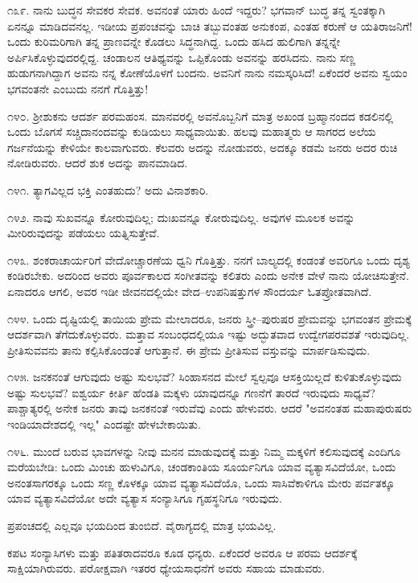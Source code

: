 ೧೩೯. ನಾನು ಬುದ್ಧನ ಸೇವಕರ ಸೇವಕ. ಅವನಂತೆ ಯಾರು ಹಿಂದೆ ಇದ್ದರು? ಭಗವಾನ್ ಬುದ್ಧ ತನ್ನ ಸ್ವಂತಕ್ಕಾಗಿ ಏನನ್ನೂ ಮಾಡಿದವನಲ್ಲ. ಇಡೀಯ ಪ್ರಪಂಚವನ್ನು ಬಾಚಿ ತಬ್ಬುವಂತಹ ಅನುಕಂಪ, ಎಂತಹ ಕರುಣೆ ಆ ಯತಿರಾಜನಿಗೆ! ಒಂದು ಕುರಿಮರಿಗಾಗಿ ತನ್ನ ಪ್ರಾಣವನ್ನೇ ಕೊಡಲು ಸಿದ್ಧನಾಗಿದ್ದ. ಒಂದು ಹಸಿದ ಹುಲಿಗಾಗಿ ತನ್ನನ್ನೇ ಅರ್ಪಿಸಿಕೊಳ್ಳುವುದರಲ್ಲಿದ್ದ. ಚಂಡಾಲನ ಆತಿಥ್ಯವನ್ನು ಒಪ್ಪಿಕೊಂಡು ಅವನನ್ನು ಹರಸಿದನು. ನಾನು ಸಣ್ಣ ಹುಡುಗನಾಗಿದ್ದಾಗ ಅವನು ನನ್ನ ಕೋಣೆಯೊಳಗೆ ಬಂದನು. ಅವನಿಗೆ ನಾನು ನಮಸ್ಕರಿಸಿದೆ! ಏಕೆಂದರೆ ಅವನು ಸ್ವಯಂ ಭಗವಂತನೇ ಎಂಬುದು ನನಗೆ ಗೊತ್ತಿತ್ತು!

೧೪೦. ಶ‍್ರೀಶುಕನು ಆದರ್ಶ ಪರಮಹಂಸ. ಮಾನವರಲ್ಲಿ ಅವನೊಬ್ಬನಿಗೆ ಮಾತ್ರ ಅಖಂಡ ಬ್ರಹ್ಮಾನಂದದ ಕಡಲಿನಲ್ಲಿ ಒಂದು ಬೊಗಸೆ ಸಚ್ಚಿದಾನಂದವನ್ನು ಕುಡಿಯಲು ಸಾಧ್ಯವಾಯಿತು. ಹಲವು ಮಹಾತ್ಮರು ಆ ಸಾಗರದ ಅಲೆಯ ಗರ್ಜನೆಯನ್ನು ಕೇಳಿಯೇ ಕಾಲವಾಗುವರು. ಕೆಲವರು ಅದನ್ನು ನೋಡುವರು, ಅದಕ್ಕೂ ಕಡಮೆ ಜನರು ಅದರ ರುಚಿ ನೋಡಿರುವರು. ಆದರೆ ಶುಕ ಅದನ್ನು ಪಾನಮಾಡಿದ.

೧೪೧. ತ್ಯಾಗವಿಲ್ಲದ ಭಕ್ತಿ ಎಂತಹುದು? ಅದು ವಿನಾಶಕಾರಿ.

೧೪೨. ನಾವು ಸುಖವನ್ನೂ ಕೋರುವುದಿಲ್ಲ; ದುಃಖವನ್ನೂ ಕೋರುವುದಿಲ್ಲ. ಅವುಗಳ ಮೂಲಕ ಅವನ್ನು ಮೀರಿರುವುದನ್ನು ಪಡೆಯಲು ಯತ್ನಿಸುತ್ತೇವೆ.

೧೪೩. ಶಂಕರಾಚಾರ್ಯರಿಗೆ ವೇದೋಚ್ಚಾರಣೆಯ ಧ್ವನಿ ಗೊತ್ತಿತ್ತು. ನನಗೆ ಬಾಲ್ಯದಲ್ಲಿ ಕಂಡಂತೆ ಅವರಿಗೂ ಒಂದು ದೃಶ್ಯ ಕಂಡಿರಬೇಕು. ಅದರಿಂದ ಅವರು ಪೂರ್ವಕಾಲದ ಸಂಗೀತವನ್ನು ಕಲಿತರು ಎಂದು ಅನೇಕ ವೇಳೆ ನಾನು ಯೋಚಿಸುತ್ತೇನೆ. ಏನಾದರೂ ಆಗಲಿ, ಅವರ ಇಡೀ ಜೀವನದಲ್ಲಿಯೇ ವೇದ–ಉಪನಿಷತ್ತುಗಳ ಸೌಂದರ್ಯ ಓತಪ್ರೋತವಾಗಿದೆ.

೧೪೪. ಒಂದು ದೃಷ್ಟಿಯಲ್ಲಿ ತಾಯಿಯ ಪ್ರೇಮ ಮೇಲಾದರೂ, ಜನರು ಸ್ತ್ರೀ–ಪುರುಷರ ಪ್ರೇಮವನ್ನು ಭಗವಂತನ ಪ್ರೇಮಕ್ಕೆ ಆದರ್ಶವಾಗಿ ತೆಗೆದುಕೊಳ್ಳುವರು. ಮತ್ತಾವ ಸಂಬಂಧದಲ್ಲಿಯೂ ಇಷ್ಟು ಅದ್ಭುತವಾದ ಉದ್ವೇಗಪರವಶತೆ ಇರುವುದಿಲ್ಲ. ಪ್ರೀತಿಸುವವನು ತಾನು ಕಲ್ಪಿಸಿಕೊಂಡಂತೆ ಆಗುತ್ತಾನೆ. ಈ ಪ್ರೇಮ ಪ್ರೀತಿಸುವ ವಸ್ತುವನ್ನು ಮಾರ್ಪಡಿಸುವುದು.

೧೪೫. ಜನಕನಂತೆ ಆಗುವುದು ಅಷ್ಟು ಸುಲಭವೆ? ಸಿಂಹಾಸನದ ಮೇಲೆ ಸ್ವಲ್ಪವೂ ಆಸಕ್ತಿಯಿಲ್ಲದೆ ಕುಳಿತುಕೊಳ್ಳುವುದು ಅಷ್ಟು ಸುಲಭವೆ? ಐಶ್ವರ್ಯ ಕೀರ್ತಿ ಹೆಂಡತಿ ಮಕ್ಕಳು ಯಾವುದನ್ನೂ ಗಣನೆಗೆ ತಾರದೆ ಇರುವುದು ಸಾಧ್ಯವೆ? ಪಾಶ್ಚಾತ್ಯರಲ್ಲಿ ಅನೇಕ ಜನರು ತಾವು ಜನಕನಂತೆ ಇರುವೆವು ಎಂದು ಹೇಳುವರು. ಆದರೆ "ಅವನಂತಹ ಮಹಾಪುರುಷರು ಇಂಡಿಯಾದೇಶದಲ್ಲಿ ಇಲ್ಲ" ಎಂದಷ್ಟೇ ಹೇಳಬೇಕಾಯಿತು.

೧೪೬. ಮುಂದೆ ಬರುವ ಭಾವಗಳನ್ನು ನೀವು ಮನನ ಮಾಡುವುದಕ್ಕೆ ಮತ್ತು ನಿಮ್ಮ ಮಕ್ಕಳಿಗೆ ಕಲಿಸುವುದಕ್ಕೆ ಎಂದಿಗೂ ಮರೆಯಬೇಡಿ: ಒಂದು ಮಿಂಚು ಹುಳುವಿಗೂ, ಚಂಡಕಾಂತಿಯ ಸೂರ್ಯನಿಗೂ ಯಾವ ವ್ಯತ್ಯಾಸವಿದೆಯೋ, ಒಂದು ಅನಂತಸಾಗರಕ್ಕೂ ಒಂದು ಸಣ್ಣ ಕೊಳಕ್ಕೂ ಯಾವ ವ್ಯತ್ಯಾಸವಿದೆಯೊ, ಒಂದು ಸಾಸಿವೆಕಾಳಿಗೂ ಮೇರು ಪರ್ವತಕ್ಕೂ ಯಾವ ವ್ಯತ್ಯಾಸವಿದೆಯೋ ಅದೇ ವ್ಯತ್ಯಾಸ ಸಂನ್ಯಾಸಿಗೂ ಗೃಹಸ್ಥನಿಗೂ ಇರುವುದು.

ಪ್ರಪಂಚದಲ್ಲಿ ಎಲ್ಲವೂ ಭಯದಿಂದ ತುಂಬಿದೆ. ವೈರಾಗ್ಯದಲ್ಲಿ ಮಾತ್ರ ಭಯವಿಲ್ಲ.

ಕಪಟ ಸಂನ್ಯಾಸಿಗಳು ಮತ್ತು ಪತಿತರಾದವರೂ ಕೂಡ ಧನ್ಯರು. ಏಕೆಂದರೆ ಅವರೂ ಆ ಪರಮ ಆದರ್ಶಕ್ಕೆ ಸಾಕ್ಷಿಯಾಗಿರುವರು. ಪರೋಕ್ಷವಾಗಿ ಇತರರ ಧ್ಯೇಯಸಾಧನೆಗೆ ಅವರು ಸಹಾಯ ಮಾಡುವರು.

